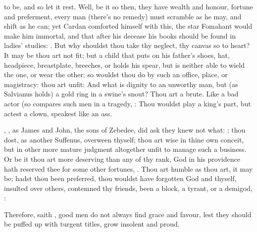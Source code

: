 {to be, and so let it rest. Well, be it so then, they have wealth and
honour, fortune and preferment, every man (there's no remedy) must
scramble as he may, and shift as he can; yet Cardan comforted himself
with this, the star Fomahant would make him immortal, and that
after his decease his books should be found in ladies' studies:
. But why shouldst thou take
thy neglect, thy canvas so to heart? It may be thou art not fit; but a
child that puts on his father's shoes, hat, headpiece,
breastplate, breeches, or holds his spear, but is neither able to wield
the one, or wear the other; so wouldst thou do by such an office,
place, or magistracy: thou art unfit: And what is dignity to an
unworthy man, but (as  Salvianus holds) a gold ring in a swine's
snout? Thou art a brute. Like a bad actor (so \Plutarch compares
such men in a tragedy, : Thou wouldst
play a king's part, but actest a clown, speakest like an ass.

, \etc{}, as James and
John, the sons of Zebedee, did ask they knew not what: ; thou dost, as another Suffenus, overween thyself; thou art wise
in thine own conceit, but in other more mature judgment altogether
unfit to manage such a business. Or be it thou art more deserving than
any of thy rank, God in his providence hath reserved thee for some
other fortunes, . Thou art humble as thou art, it may
be; hadst thou been preferred, thou wouldst have forgotten God and
thyself, insulted over others, contemned thy friends, been a
block, a tyrant, or a demigod, :

Therefore, saith \Chrysostom, good men do not always find grace
and favour, lest they should be puffed up with turgent titles, grow
insolent and proud.

}
